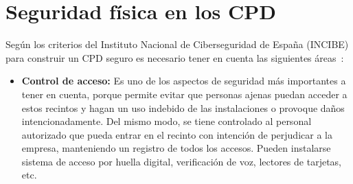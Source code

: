 \section{Seguridad física en los CPD}\label{sec:seguridad_fisica_CPD}
Según los criterios del Instituto Nacional de Ciberseguridad de España (INCIBE) para construir un CPD seguro es necesario tener en cuenta las siguientes áreas~\cite{instituto_nacional_de_ciberseguridad_de_espana_pon_2015}:
\begin{itemize}
	\item \textbf{Control de acceso:} Es uno de los aspectos de seguridad más importantes a tener en cuenta, porque permite evitar que personas ajenas puedan acceder a estos recintos y hagan un uso indebido de las instalaciones o provoque daños intencionadamente. Del mismo modo, se tiene controlado al personal autorizado que pueda entrar en el recinto con intención de perjudicar a la empresa, manteniendo un registro de todos los accesos. Pueden instalarse sistema de acceso por huella digital, verificación de voz, lectores de tarjetas, etc.


\end{itemize}
